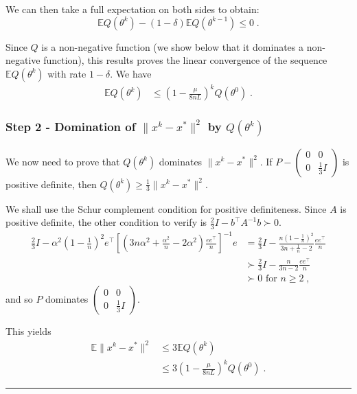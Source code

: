 \documentclass{article}
\newcommand{\idm}{I}
\newcommand{\BlackBox}{\rule{1.5ex}{1.5ex}}  %
\newenvironment{proof}{\par\noindent{\bf Proof\ }}{\hfill\BlackBox\\[2mm]}
\def\E{_{\scriptscriptstyle E}}
\def \E{{\mathbb E}}
\def \E{{\mathbb E}}
\begin{document}
\begin{proof}
We can then take a full expectation on both sides to obtain:
\[
\E  Q(\theta^k)   - (1 - \delta) \E Q(\theta^{k-1}) \leqslant 0 \; .
\]

Since $Q$ is a non-negative function (we show below that it dominates a non-negative function), this results proves the linear convergence of the sequence $\E Q(\theta^k)$ with rate $1 - \delta$. We have
\begin{align*}
\E Q(\theta^k) 	& \leqslant \left(1 - \frac{\mu}{8nL}\right)^k Q(\theta^0) \; .
\end{align*}

\subsubsection*{Step 2 - Domination of $\|x^k - x^\ast\|^2$ by $Q(\theta^k)$}

We now need to prove that $Q(\theta^k)$ dominates $\|x^k - x^\ast\|^2$. If $\displaystyle P - \left( \begin{array}{cc} 0 & 0 \\ 0 & \frac{1}{3} \idm \end{array} \right)$ is positive definite, then $Q(\theta^k) \geqslant \frac{1}{3} \|x^k - x^\ast\|^2$.

We shall use the Schur complement condition for positive definiteness. Since $A$ is positive definite, the other condition to verify is $\frac{2}{3}\idm - b^\top A^{-1} b \succ 0$.
\begin{align*}
\frac{2}{3}\idm - \alpha^2\left(1 - \frac{1}{n}\right)^2 e^\top \left[\left(3 n\alpha^2 + \frac{\alpha^2}{n} - 2\alpha^2\right)\frac{ee^\top}{n}\right]^{-1}e &= \frac{2}{3}\idm -\frac{n\left(1 - \frac{1}{n}\right)^2}{3 n + \frac{1}{n} - 2}\frac{ee^\top}{n}\\
&\succ \frac{2}{3}\idm -\frac{n}{3 n - 2}\frac{ee^\top}{n}\\
&\succ 0 \textrm{ for } n \geqslant 2 \; ,
\end{align*}
and so $P$ dominates $\left( \begin{array}{cc} 0 & 0 \\ 0 & \frac{1}{3} \idm \end{array} \right)$.

This yields
\begin{align*}
\E \| x^k - x^\ast \|^2 	& \leqslant 3\E Q(\theta^k) \\
& \leqslant 3 \left(1 - \frac{\mu}{8nL}\right)^k Q(\theta^0) \; .
\end{align*}


\end{proof}
\end{document}
